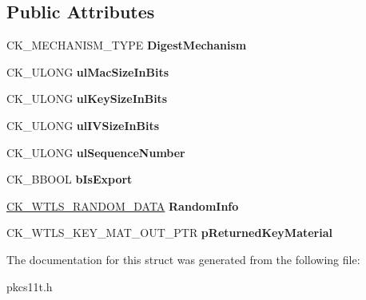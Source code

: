\subsection*{Public Attributes}
\begin{DoxyCompactItemize}
\item 
\mbox{\label{struct_c_k___w_t_l_s___k_e_y___m_a_t___p_a_r_a_m_s_aea2b231b8552ac86c6dc0434b0502e2b}} 
C\+K\+\_\+\+M\+E\+C\+H\+A\+N\+I\+S\+M\+\_\+\+T\+Y\+PE {\bfseries Digest\+Mechanism}
\item 
\mbox{\label{struct_c_k___w_t_l_s___k_e_y___m_a_t___p_a_r_a_m_s_aa4891256daf5ff764421a7b967b525b9}} 
C\+K\+\_\+\+U\+L\+O\+NG {\bfseries ul\+Mac\+Size\+In\+Bits}
\item 
\mbox{\label{struct_c_k___w_t_l_s___k_e_y___m_a_t___p_a_r_a_m_s_a1fd499c0edb2cd4fd1877301e554ffd7}} 
C\+K\+\_\+\+U\+L\+O\+NG {\bfseries ul\+Key\+Size\+In\+Bits}
\item 
\mbox{\label{struct_c_k___w_t_l_s___k_e_y___m_a_t___p_a_r_a_m_s_a37e7d3d8619b180e6b0e6442006b2f43}} 
C\+K\+\_\+\+U\+L\+O\+NG {\bfseries ul\+I\+V\+Size\+In\+Bits}
\item 
\mbox{\label{struct_c_k___w_t_l_s___k_e_y___m_a_t___p_a_r_a_m_s_aa0827a5a42d3e3679898636dee382c59}} 
C\+K\+\_\+\+U\+L\+O\+NG {\bfseries ul\+Sequence\+Number}
\item 
\mbox{\label{struct_c_k___w_t_l_s___k_e_y___m_a_t___p_a_r_a_m_s_acac1b1ee6edf25ca628f6e1c31cd90ca}} 
C\+K\+\_\+\+B\+B\+O\+OL {\bfseries b\+Is\+Export}
\item 
\mbox{\label{struct_c_k___w_t_l_s___k_e_y___m_a_t___p_a_r_a_m_s_ac73d57990771b7c66499385866a15641}} 
\hyperlink{struct_c_k___w_t_l_s___r_a_n_d_o_m___d_a_t_a}{C\+K\+\_\+\+W\+T\+L\+S\+\_\+\+R\+A\+N\+D\+O\+M\+\_\+\+D\+A\+TA} {\bfseries Random\+Info}
\item 
\mbox{\label{struct_c_k___w_t_l_s___k_e_y___m_a_t___p_a_r_a_m_s_a2ce311c67e150c9a9ada167e8492db94}} 
C\+K\+\_\+\+W\+T\+L\+S\+\_\+\+K\+E\+Y\+\_\+\+M\+A\+T\+\_\+\+O\+U\+T\+\_\+\+P\+TR {\bfseries p\+Returned\+Key\+Material}
\end{DoxyCompactItemize}


The documentation for this struct was generated from the following file\+:\begin{DoxyCompactItemize}
\item 
pkcs11t.\+h\end{DoxyCompactItemize}
